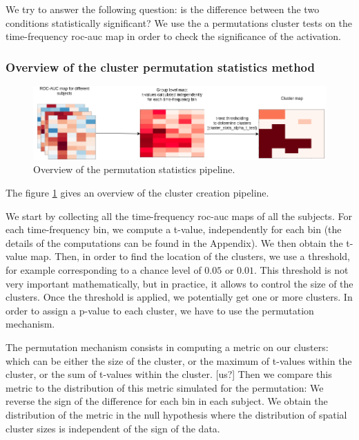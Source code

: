 We try to answer the following question: is the difference between
the two conditions statistically significant? We use the a permutations
cluster tests on the time-frequency roc-auc map in order to check the significance of the activation.

\subsubsection{Overview of the cluster permutation statistics method}

\begin{figure}[ht]
    \centering
    \includegraphics[width=15cm]{images_report/sensor/Permutation_statistics.png}
    \caption[Overview of the permutation statistics pipeline.]%
    {Overview of the permutation statistics pipeline.}
    \label{permutation_statistics_pipeline}
\end{figure}

The figure \ref{permutation_statistics_pipeline} gives an overview of the cluster creation pipeline.

We start by collecting all the time-frequency roc-auc maps of all the subjects. For each time-frequency bin, we compute a t-value, independently for each bin (the details of the computations can be found in the Appendix). We then obtain the t-value map. Then, in order to find the location of the clusters, we use a threshold, for example corresponding to a chance level of $0.05$ or $0.01$. This threshold is not very important mathematically, but in practice, it allows to control the size of the clusters. Once the threshold is applied, we potentially get one or more clusters. In order to assign a p-value to each cluster, we have to use the permutation mechanism.

The permutation mechanism consists in computing a metric on our clusters: which can be either the size of the cluster, or the maximum of t-values within the cluster, or the sum of t-values within the cluster. [us?] Then we compare this metric to the distribution of this metric simulated for the permutation:
We reverse the sign of the difference for each bin in each subject. We obtain the distribution of the metric in the null hypothesis where the distribution of spatial cluster sizes is independent of the sign of the data.

